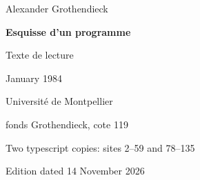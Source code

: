 \documentclass[11pt,a4paper]{article}
\newcommand{\EditionTitle}{Esquisse d'un programme}
\newcommand{\EditionForm}{Texte de lecture}
\begin{document}
\begin{titlepage}
\centering
\vspace*{18mm}
{\Large Alexander Grothendieck\par}
\vspace{12mm}
{\Huge\bfseries\EditionTitle\par}
\vspace{8mm}
{\Large\EditionForm\par}
\vspace{14mm}
{\large January 1984\par}
\vfill
{\large Université de Montpellier\par fonds Grothendieck, cote 119\par}
\vspace{8mm}
{\normalsize Two typescript copies: sites 2--59 and 78--135\par}
\vspace{8mm}
{\normalsize Edition dated 14 November 2026\par}
\end{titlepage}
\thispagestyle{plain}
\end{document}
